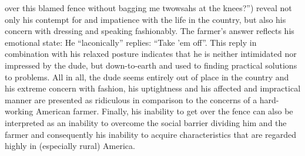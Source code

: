 over this blamed fence without bagging me twowsahs at the knees?”) reveal not only his contempt for and impatience with the life in the country, but also his concern with dressing and speaking fashionably. The farmer’s answer reflects his emotional state: He “laconically” replies: “Take ’em off”. This reply in combination with his relaxed posture indicates that he is neither intimidated nor impressed by the dude, but down-to-earth and used to finding practical solutions to problems. All in all, the dude seems entirely out of place in the country and his extreme concern with fashion, his uptightness and his affected and impractical manner are presented as ridiculous in comparison to the concerns of a hard-working American farmer. Finally, his inability to get over the fence can also be interpreted as an inability to overcome the social barrier dividing him and the farmer and consequently his inability to acquire characteristics that are regarded highly in (especially rural) America.


